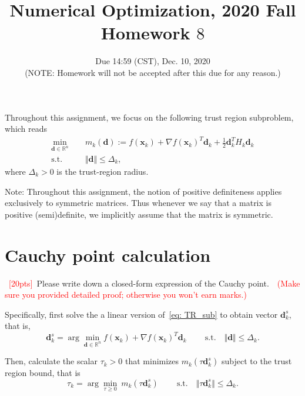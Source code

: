 \documentclass[10pt]{article}
\begin{document}
	
\title{	Numerical Optimization, 2020 Fall\\Homework $8$}
\date{Due 14:59 (CST), Dec. 10, 2020 \\(NOTE: Homework will not be accepted after this due for any reason.)\\}
\maketitle
Throughout this assignment, we focus on the following trust region subproblem, which reads
\begin{equation}\label{eq: TR_sub}
	\begin{aligned}
		\min_{\bm{d}\in\mathbb{R}^{n}}~&\quad m_{k}(\bm{d}):= f(\bm{x}_{k}) + \nabla f(\bm{x}_{k})^{T}\bm{d}_{k} + \tfrac{1}{2}\bm{d}_{k}^{T}H_{k}\bm{d}_{k}\\
		\textrm{s.t.}~~\ &\quad\Vert\bm{d}\Vert\leq \Delta_{k},
	\end{aligned}
\end{equation}
where $\Delta_{k} > 0$ is the trust-region radius.

Note: Throughout this assignment, the notion of positive definiteness applies exclusively to symmetric matrices. Thus whenever we say that a matrix is positive (semi)definite, we implicitly assume that the matrix is symmetric.
\section{Cauchy point calculation}
~\textcolor{red}{[20pts]}~Please write down a closed-form expression of the Cauchy point.~\textcolor{red}{~(Make sure you provided detailed proof; otherwise you won't earn marks.)}

Specifically, first solve the a linear version of~\eqref{eq: TR_sub} to obtain vector $\bm{d}^{s}_{k}$, that is,
\begin{equation}\label{eq:linear_tr}
	\bm{d}^{s}_{k} = \arg\min_{\bm{d}\in\mathbb{R}^{n}}f(\bm{x}_{k}) + \nabla f(\bm{x}_{k})^{T}\bm{d}_{k}\qquad~\textrm{s.t.}\quad\Vert\bm{d}\Vert\leq \Delta_{k}.
\end{equation}

Then, calculate the scalar $\tau_{k}>0$ that minimizes $m_{k}(\tau\bm{d}^{s}_{k})$ subject to the trust region bound, that is
\begin{equation}\label{eq: scalar_cal}
	\tau_{k} = \arg\min_{\tau\geq0}~m_{k}(\tau\bm{d}^{s}_{k})\qquad~\textrm{s.t.}\quad\Vert\tau\bm{d}^{s}_{k}\Vert\leq \Delta_{k}.
\end{equation}
\end{document}
